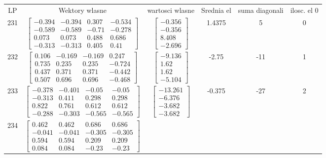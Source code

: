 \documentclass[a4paper,12pt]{article}
\begin{document}
\bgroup {} \vspace{0.2in} \begin{tabular}{c c c c c c}
LP &Wektory wlasne & wartosci wlasne & Srednia el & suma diagonali & ilosc. el 0\\
231
&
$\begin{bmatrix} -0.394 & -0.394 & 0.307 & -0.534 \\ -0.589 & -0.589 & -0.71 & -0.278 \\ 0.073 & 0.073 & 0.488 & 0.686 \\ -0.313 & -0.313 & 0.405 & 0.41 \end{bmatrix}$
&
$\begin{bmatrix} -0.356 \\ -0.356 \\ 8.408 \\ -2.696 \end{bmatrix}$
&
1.4375
&
5
&
0
\\
232
&
$\begin{bmatrix} 0.106 & -0.169 & -0.169 & 0.247 \\ 0.735 & 0.235 & 0.235 & -0.724 \\ 0.437 & 0.371 & 0.371 & -0.442 \\ 0.507 & 0.696 & 0.696 & -0.468 \end{bmatrix}$
&
$\begin{bmatrix} -9.136 \\ 1.62 \\ 1.62 \\ -5.104 \end{bmatrix}$
&
-2.75
&
-11
&
1
\\
233
&
$\begin{bmatrix} -0.378 & -0.401 & -0.05 & -0.05 \\ -0.313 & 0.411 & 0.298 & 0.298 \\ 0.822 & 0.761 & 0.612 & 0.612 \\ -0.288 & -0.303 & -0.565 & -0.565 \end{bmatrix}$
&
$\begin{bmatrix} -13.261 \\ -6.376 \\ -3.682 \\ -3.682 \end{bmatrix}$
&
-0.375
&
-27
&
2
\\
234
&
$\begin{bmatrix} 0.462 & 0.462 & 0.686 & 0.686 \\ -0.041 & -0.041 & -0.305 & -0.305 \\ 0.594 & 0.594 & 0.209 & 0.209 \\ 0.084 & 0.084 & -0.23 & -0.23 \end{bmatrix}$

\end{tabular}
\end{document}
